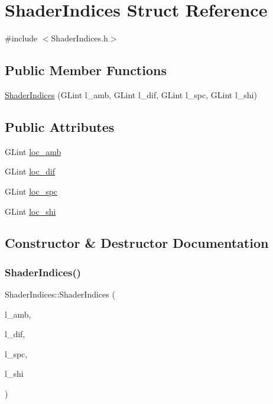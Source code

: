 \hypertarget{struct_shader_indices}{}\section{Shader\+Indices Struct Reference}
\label{struct_shader_indices}


{\ttfamily \#include $<$Shader\+Indices.\+h$>$}

\subsection*{Public Member Functions}
\begin{DoxyCompactItemize}
\item 
\hyperlink{struct_shader_indices_a1c4546e1ea7fc53b958d2be8b50aa3ce}{Shader\+Indices} (G\+Lint l\+\_\+amb, G\+Lint l\+\_\+dif, G\+Lint l\+\_\+spc, G\+Lint l\+\_\+shi)
\end{DoxyCompactItemize}
\subsection*{Public Attributes}
\begin{DoxyCompactItemize}
\item 
G\+Lint \hyperlink{struct_shader_indices_a7c0b0f9199914b3b6cd1944d41c609a3}{loc\+\_\+amb}
\item 
G\+Lint \hyperlink{struct_shader_indices_aa3df8d026b2faa1bc06e79618c86a77c}{loc\+\_\+dif}
\item 
G\+Lint \hyperlink{struct_shader_indices_a78c40b0a417042217c80c46d9a2b543a}{loc\+\_\+spc}
\item 
G\+Lint \hyperlink{struct_shader_indices_a09528fea691de3860ad75b63ec6a00bb}{loc\+\_\+shi}
\end{DoxyCompactItemize}


\subsection{Constructor \& Destructor Documentation}
\mbox{\label{struct_shader_indices_a1c4546e1ea7fc53b958d2be8b50aa3ce}} 
\subsubsection{\texorpdfstring{Shader\+Indices()}{ShaderIndices()}}
{\footnotesize\ttfamily Shader\+Indices\+::\+Shader\+Indices (\begin{DoxyParamCaption}\item[{G\+Lint}]{l\+\_\+amb,  }\item[{G\+Lint}]{l\+\_\+dif,  }\item[{G\+Lint}]{l\+\_\+spc,  }\item[{G\+Lint}]{l\+\_\+shi }\end{DoxyParamCaption})\hspace{0.3cm}{\ttfamily [inline]}}



